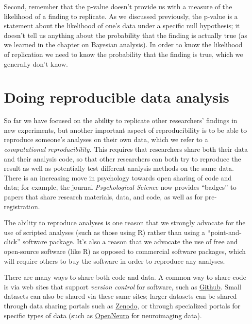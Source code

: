 \documentclass[12pt,]{book}
\theoremstyle{definition}
\theoremstyle{definition}
\theoremstyle{definition}
\theoremstyle{remark}
\begin{document}
Second, remember that the p-value doesn't provide us with a measure of the likelihood of a finding to replicate. As we discussed previously, the p-value is a statement about the likelihood of one's data under a specific null hypothesis; it doesn't tell us anything about the probability that the finding is actually true (as we learned in the chapter on Bayesian analysis). In order to know the likelihood of replication we need to know the probability that the finding is true, which we generally don't know.

\hypertarget{doing-reproducible-data-analysis}{%
\section{Doing reproducible data analysis}\label{doing-reproducible-data-analysis}}

So far we have focused on the ability to replicate other researchers' findings in new experiments, but another important aspect of reproducibility is to be able to reproduce someone's analyses on their own data, which we refer to a \emph{computational reproducibility.} This requires that researchers share both their data and their analysis code, so that other researchers can both try to reproduce the result as well as potentially test different analysis methods on the same data. There is an increasing move in psychology towards open sharing of code and data; for example, the journal \emph{Psychological Science} now provides ``badges'' to papers that share research materials, data, and code, as well as for pre-registration.

The ability to reproduce analyses is one reason that we strongly advocate for the use of scripted analyses (such as those using R) rather than using a ``point-and-click'' software package. It's also a reason that we advocate the use of free and open-source software (like R) as opposed to commercial software packages, which will require others to buy the software in order to reproduce any analyses.

There are many ways to share both code and data. A common way to share code is via web sites that support \emph{version control} for software, such as \href{http://github.com}{Github}. Small datasets can also be shared via these same sites; larger datasets can be shared through data sharing portals such as \href{https://zenodo.org/}{Zenodo}, or through specialized portals for specific types of data (such as \href{http://openneuro.org}{OpenNeuro} for neuroimaging data).
\end{document}
